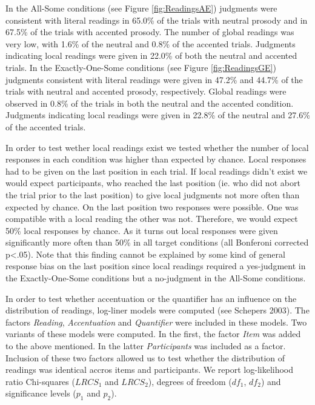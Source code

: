 \documentclass[fleqn,reqno,10pt,draft]{article}
\begin{document}
In the All-Some conditions (see Figure \ref{fig:ReadingsAE}) judgments
were consistent with literal readings in 65.0\% of the trials with
neutral prosody and in 67.5\% of the trials with accented prosody. The
number of global readings was very low, with 1.6\% of the neutral and
0.8\% of the accented trials. Judgments indicating local readings were
given in 22.0\% of both the neutral and accented trials. In the
Exactly-One-Some conditions (see Figure \ref{fig:ReadingsGE})
judgments consistent with literal readings were given in 47.2\% and
44.7\% of the trials with neutral and accented prosody,
respectively. Global readings were observed in 0.8\% of the trials in
both the neutral and the accented condition. Judgments indicating
local readings were given in 22.8\% of the neutral and 27.6\% of the
accented trials.

In order to test wether local readings exist we tested whether the
number of local responses in each condition was higher than expected
by chance. Local responses had to be given on the last position in
each trial. If local readings didn't exist we would expect
participants, who reached the last position (ie. who did not abort the
trial prior to the last position) to give local judgments not more
often than expected by chance. On the last position two responses were
possible. One was compatible with a local reading the other was
not. Therefore, we would expect 50\% local responses by chance. As it
turns out local responses were given significantly more often than
50\% in all target conditions (all Bonferoni corrected p<.05). Note
that this finding cannot be explained by some kind of general response
bias on the last position since local readings required a yes-judgment
in the Exactly-One-Some conditions but a no-judgment in the All-Some
conditions.

In order to test whether accentuation or the quantifier has an
influence on the distribution of readings, log-liner models were
computed (see Schepers 2003). The factors {\it Reading}, {\it
  Accentuation} and {\it Quantifier} were included in these
models. Two variants of these models were computed.  In the first, the
factor {\it Item} was added to the above mentioned. In the latter {\it
  Participants} was included as a factor. Inclusion of these two
factors allowed us to test whether the distribution of readings was
identical accros items and participants. We report log-likelihood
ratio Chi-squares ($LRCS_1$ and $LRCS_2$), degrees of freedom ($df_1$,
$df_2$) and significance levels ($p_1$ and $p_2$).
\end{document}
